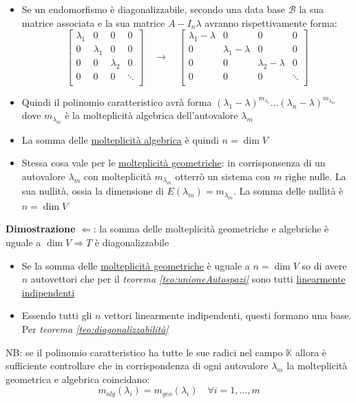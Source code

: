 \documentclass[12pt,a4paper,oneside]{article}
\begin{document}
\begin{itemize}
	\item  Se un endomorfismo è diagonalizzabile, secondo una data base $ \mathcal{B} $ la sua matrice associata e la sua matrice $ A - I_n \lambda  $ avranno rispettivamente forma:
	      \[
		      \begin{bmatrix}
			      \lambda_1 & 0         & 0         & 0      \\
			      0         & \lambda_1 & 0         & 0      \\
			      0         & 0         & \lambda_2 & 0      \\
			      0         & 0         & 0         & \ddots \\
		      \end{bmatrix}
		      \quad
		      \rightarrow
		      \quad
		      \begin{bmatrix}
			      \lambda_1-\lambda & 0                  & 0                   & 0      \\
			      0                 & \lambda_1 -\lambda & 0                   & 0      \\
			      0                 & 0                  & \lambda_2 - \lambda & 0      \\
			      0                 & 0                  & 0                   & \ddots \\
		      \end{bmatrix}
	      \]
	\item Quindi il polinomio caratteristico avrà forma $ \left( \lambda_1 - \lambda  \right)^{m_{\lambda_1}} \ldots \left( \lambda_n - \lambda  \right)^{m_{\lambda_m}}$ dove $ m_{\lambda_m} $ è la molteplicità algebrica dell'autovalore $ \lambda_m $
	\item La somma delle \underline{molteplicità algebrica} è quindi $ n = \dim  V $
	\item Stessa cosa vale per le \underline{molteplicità geometriche}: in corrisponsenza di un autovalore $ \lambda_m $ con molteplicità $ m_{\lambda_m} $ otterrò un sistema con $ m $ righe nulle. La sua nullità, ossia la dimensione di $ E\left( \lambda_m \right)=m_{\lambda_m}  $. La somma delle nullità è $ n = \dim  V $
\end{itemize}
\textbf{Dimostrazione} $ \Leftarrow $: la somma delle molteplicità geometriche e algebriche è uguale a $ \dim V  \Rightarrow  T $ è diagonalizzabile
\begin{itemize}
	\item Se la somma delle \underline{molteplicità geometriche} è uguale a $ n = \dim V $ so di avere $ n $ autovettori che per il \textit{teorema  \ref{teo:unioneAutospazi}} sono tutti \underline{linearmente indipendenti}
	\item Essendo tutti gli $ n $ vettori linearmente indipendenti, questi formano una base. Per \textit{teorema  \ref{teo:diagonalizzabilità}}
\end{itemize}
NB: se il polinomio caratteristico ha tutte le sue radici nel campo $ \mathbb{K} $ allora è sufficiente controllare che in corrispondenza di ogni autovalore $ \lambda_m $ la molteplicità geometrica e algebrica coincidano:
\[
	m_{alg}\left( \lambda_i \right) = m_{geo}\left( \lambda_i \right) \quad \forall i = 1, \ldots, m
\]
\end{document}
